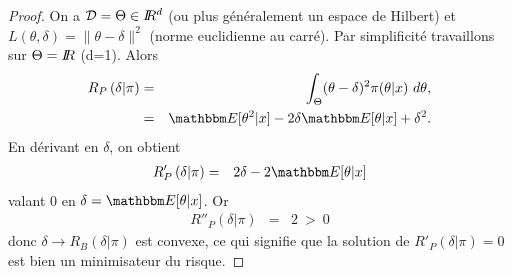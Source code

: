 \begin{proof}%
On a ${\cal{D}}=\Theta\in I\!\!R^d$ (ou plus généralement un espace de Hilbert) et $L(\theta,\delta)=\|\theta-\delta\|^2$ (norme euclidienne au carré). Par simplificité travaillons sur $\Theta=I\!\!R$ (d=1). Alors
\begin{eqnarray*}
R_{P}\left(\delta|\pi\right) & = & \int_{\Theta} (\theta-\delta)^2 \pi(\theta|x) \ d\theta, \\
& = & \E[\theta^2|x] - 2\delta\E[\theta|x] + \delta^2.
\end{eqnarray*}
En dérivant en $\delta$, on obtient 
\begin{eqnarray*}
R'_{P}\left(\delta|\pi\right) & = & 2\delta-2\E[\theta|x]
\end{eqnarray*}
valant 0 en $\delta=\E[\theta|x]$. Or
\begin{eqnarray*}
R''_{P}\left(\delta|\pi\right) & = & 2 \ > \ 0
\end{eqnarray*}
donc  $\delta\to R_{B}\left(\delta|\pi\right)$ est convexe, ce qui signifie que la solution de $R'_{P}\left(\delta|\pi\right)=0$ est bien un minimisateur du risque. 
 \end{proof}